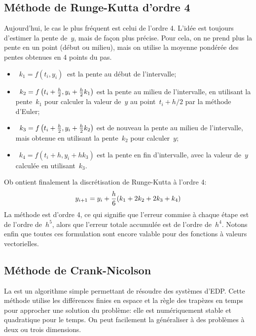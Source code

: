\subsection{Méthode de Runge-Kutta d'ordre 4} Aujourd'hui, le cas le plus fréquent est celui de l'ordre 4. L'idée est toujours d'estimer la pente de~$y$, mais de façon plus précise. Pour cela, on ne prend plus la pente en un point (début ou milieu), mais on utilise la moyenne pondérée des pentes obtenues en 4 points du pas. 
\begin{itemize} 
\item~$k_1 = f \left( t_i, y_i \right)~$ est la pente au début de l'intervalle; 
\item~$k_2 = f \left( t_i + {h \over 2}, y_i + {h\over 2} k_1 \right)$ est la pente au milieu de l'intervalle, en utilisant la pente~$k_1$ pour calculer la valeur de~$y$ au point~$t_i + h/2$ par la méthode d'Euler; 
\item~$k_3 = f \left( t_i + {h \over 2}, y_i + {h\over 2} k_2 \right)$ est de nouveau la pente au milieu de l'intervalle, mais obtenue en utilisant la pente~$k_2$ pour calculer~$y$; 
\item~$k_4 = f \left( t_i + h, y_i + h k_3\right)$ est la pente en fin d'intervalle, avec la valeur de~$y$ calculée en utilisant~$k_3$. 
\end{itemize} 
 Ob ontient finalement la discrétisation de Runge-Kutta à l'ordre 4:
\begin{equation}
y_{i+1} = y_i + {h \over 6} (k_1 + 2k_2 + 2k_3 + k_4)
\end{equation}
La méthode est d'ordre 4, ce qui signifie que l'erreur commise à chaque étape est de l'ordre de~$h^5$, alors que l'erreur totale accumulée est de l'ordre de~$h^4$. Notons enfin que toutes ces formulation sont encore valable pour des fonctions à valeurs vectorielles. 
\medskip
\subsection{Méthode de Crank-Nicolson}

La  
est un algorithme simple permettant de résoudre des systèmes d'EDP. 
Cette méthode utilise les différences finies en espace et la règle des trapèzes en temps pour approcher une solution du problème: 
elle est numériquement stable et quadratique pour le temps. 
On peut facilement la généraliser à des problèmes à deux ou trois dimensions.

